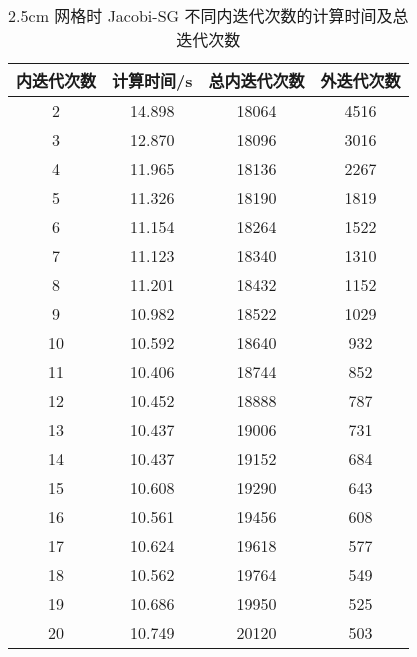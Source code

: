 \begin{datasheet}
\begin{table}
\centering
\caption{2.5cm 网格时 Jacobi-SG 不同内迭代次数的计算时间及总迭代次数}
\label{tab:equsolve.iter.jacobi-sg.2.5cm}
\begin{tabular}{cccc}
\toprule
内迭代次数 & 计算时间/s & 总内迭代次数 & 外迭代次数\\
\midrule
2 & 14.898 & 18064 & 4516\\
3 & 12.870 & 18096 & 3016\\
4 & 11.965 & 18136 & 2267\\
5 & 11.326 & 18190 & 1819\\
6 & 11.154 & 18264 & 1522\\
7 & 11.123 & 18340 & 1310\\
8 & 11.201 & 18432 & 1152\\
9 & 10.982 & 18522 & 1029\\
10 & 10.592 & 18640 & 932\\
11 & 10.406 & 18744 & 852\\
12 & 10.452 & 18888 & 787\\
13 & 10.437 & 19006 & 731\\
14 & 10.437 & 19152 & 684\\
15 & 10.608 & 19290 & 643\\
16 & 10.561 & 19456 & 608\\
17 & 10.624 & 19618 & 577\\
18 & 10.562 & 19764 & 549\\
19 & 10.686 & 19950 & 525\\
20 & 10.749 & 20120 & 503\\
\bottomrule
\end{tabular}
\end{table}


\end{datasheet}
